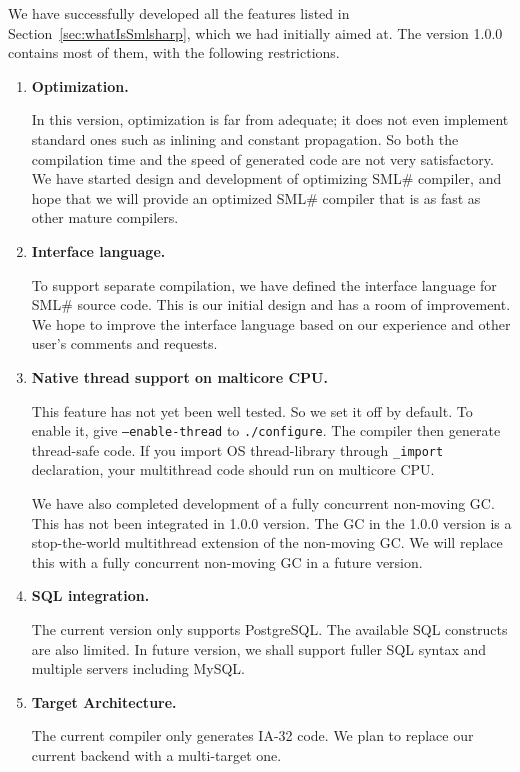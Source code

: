 \documentclass{jbook}
\newcommand{\smlsharp}{SML\#}
\newcommand{\version}{1.0.0}
\begin{document}
	We have successfully developed all the features listed in
Section~\ref{sec:whatIsSmlsharp}, which we had initially aimed at.
	The version \version{} contains most of them, with the following 
restrictions.
\begin{enumerate}
\item {\bf Optimization.}

	In this version, optimization is far from adequate; it does not
even implement standard ones such as inlining and constant propagation.
	So both the compilation time and the speed of generated code are
not very satisfactory.
	We have started design and development of optimizing \smlsharp{}
compiler, and hope that we will provide an optimized \smlsharp{}
compiler that is as fast as other mature compilers.

\item {\bf Interface language.}

	To support separate compilation, we have defined the interface
language for \smlsharp{} source code.
	This is our initial design and has a room of improvement.
	We hope to improve the interface language based on our experience
and other user's comments and requests.


\item {\bf Native thread support on malticore CPU.}

	This feature has not yet been well tested.
	So we set it off by default.
	To enable it, give {\tt --enable-thread} to {\tt ./configure}. 
	The compiler then generate thread-safe code.
	If you import OS thread-library through {\tt \_import}
declaration, your multithread code should run on multicore CPU.

	We have also completed development of a fully concurrent
non-moving GC.
	This has not been integrated in \version{} version.
	The GC in the \version{} version is a stop-the-world multithread
extension of the non-moving GC.
	We will replace this with a fully concurrent non-moving GC in
a future version.

\item {\bf SQL integration.}

	The current version only supports PostgreSQL.
	The available SQL constructs are also limited.
	In future version, we shall support fuller SQL syntax and
multiple servers including MySQL.

\item {\bf Target Architecture.}

	The current compiler only generates IA-32 code.
	We plan to replace our current backend with a multi-target one.


\end{enumerate}
\end{document}
